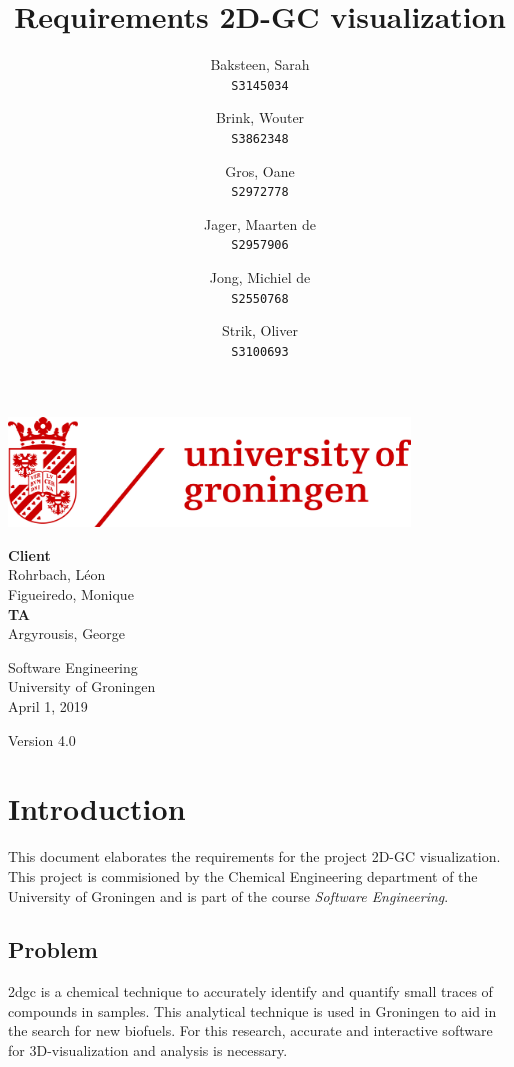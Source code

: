 \documentclass{article}
\title{Requirements 2D-GC visualization}
\author{
  Baksteen, Sarah\\
  \texttt{S3145034}
  \and
  Brink, Wouter\\
  \texttt{S3862348}
  \and
  Gros, Oane\\
  \texttt{S2972778}
  \and
  Jager, Maarten de \\
  \texttt{S2957906}
  \and
  Jong, Michiel de \\
  \texttt{S2550768}
  \and
  Strik, Oliver\\
  \texttt{S3100693}
}
\date{}
\makeatletter
\renewcommand\tableofcontents{%
  \null\hfill\textbf{\Large\contentsname}\hfill\null\par
  \@mkboth{\MakeUppercase\contentsname}{\MakeUppercase\contentsname}%
  \@starttoc{toc}%
}
\makeatother
\begin{document}
\clearpage
\maketitle
\thispagestyle{empty}
\begin{center}
    \vfill
    \includegraphics[width=0.8\textwidth]{UG_logo.jpg}
    \vfill
    
    \Large
    \textbf{Client} \\
    Rohrbach, Léon \\
    Figueiredo, Monique \\
    
    \vspace{1cm}
    \textbf{TA} \\
    Argyrousis, George
    
    \vspace{2cm}
        Software Engineering \\
        University of Groningen \\
        April 1, 2019  \\
        \empty
        
        \vspace{1cm}
        Version 4.0
\end{center}
\newpage
\tableofcontents

\newpage\setcounter{page}{1}
\section{Introduction}
This document elaborates the requirements for the project 2D-GC visualization. This project is commisioned by the Chemical Engineering department of the University of Groningen and is part of the course \textit{Software Engineering}.  

\subsection{Problem}
\acrfull{2dgc}  is a chemical technique to accurately identify and quantify small traces of compounds in samples. This analytical technique is used in Groningen to aid in the search for new biofuels. For this research, accurate and interactive software for 3D-visualization and analysis is necessary. 
\end{document}
